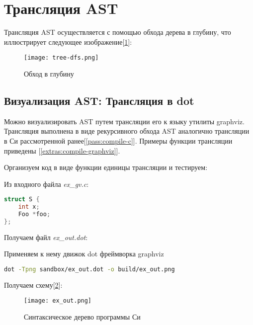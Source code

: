 \clearpage
\section{Трансляция AST}

Трансляция AST осуществляется с помощью обхода дерева в глубину, что иллюстрирует следующее изображение[\ref{pass:compile-c:dfs-diag}]:

\begin{figure}[h!]
    \texttt{[image: tree-dfs.png]}
    \centering
    \caption{Обход в глубину}
    \label{pass:compile-c:dfs-diag}
\end{figure}
\FloatBarrier

\subsection{Визуализация AST: Трансляция в dot}
\label{pass:compile-dot}

Можно визуализировать AST путем трансляции его к языку  утилиты graphviz.
Трансляция выполнена в виде рекурсивного обхода AST аналогично трансляции в Си рассмотренной ранее[\ref{pass:compile-c}].
Примеры функции трансляции приведены [\ref{extras:compile-graphviz}].

Организуем код в виде функции единицы трансляции и тестируем:



Из входного файла \textit{ex\_gv.c}:

\begin{lstlisting}[language=c, caption={ex\_gv.c}]
struct S {
    int x;
    Foo *foo;
};
\end{lstlisting}

Получаем файл \textit{ex\_out.dot}:


\clearpage
Применяем к нему движок dot фреймворка graphviz
\begin{lstlisting}[language=bash]
dot -Tpng sandbox/ex_out.dot -o build/ex_out.png
\end{lstlisting}

Получаем схему[\ref{graphviz:struct}]:

\begin{figure}[h!]
    \texttt{[image: ex\_out.png]}
    \centering
    \caption{Синтаксическое дерево программы Си}
    \label{graphviz:struct}
\end{figure}

